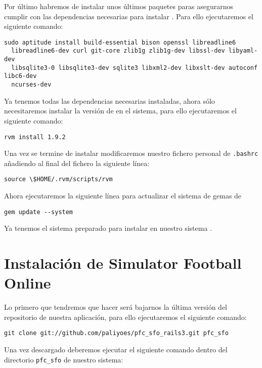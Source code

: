Por último habremos de instalar unos últimos paquetes paras asegurarnos cumplir
con las dependencias necesarias para instalar . Para ello
ejecutaremos el siguiente comando:

\begin{lstlisting}[style=consola]
  sudo aptitude install build-essential bison openssl libreadline6
  libreadline6-dev curl git-core zlib1g zlib1g-dev libssl-dev libyaml-dev
  libsqlite3-0 libsqlite3-dev sqlite3 libxml2-dev libxslt-dev autoconf libc6-dev
  ncurses-dev
\end{lstlisting}

Ya tenemos todas las dependencias necesarias instaladas, ahora sólo
necesitaremos instalar la versión de  en el sistema, para ello
ejecutaremos el siguiente comando:

\begin{lstlisting}[style=consola]
  rvm install 1.9.2
\end{lstlisting}

Una vez se termine de instalar modificaremos nuestro fichero personal de
\texttt{.bashrc} añadiendo al final del fichero la siguiente línea:

\begin{lstlisting}[style=consola]
  source \$HOME/.rvm/scripts/rvm
\end{lstlisting}

Ahora ejecutaremos la siguiente línea para actualizar el sistema de gemas de

\begin{lstlisting}[style=consola]
  gem update --system
\end{lstlisting}

Ya tenemos el sistema preparado para instalar en nuestro sistema
.

\section{Instalación de Simulator Football Online}

Lo primero que tendremos que hacer será bajarnos la última versión del
repositorio de nuestra aplicación, para ello ejecutaremos el siguiente comando:

\begin{lstlisting}[style=consola]
  git clone git://github.com/paliyoes/pfc_sfo_rails3.git pfc_sfo
\end{lstlisting}

Una vez descargado deberemos ejecutar el siguiente comando dentro del directorio
\texttt{pfc\_sfo} de nuestro sistema:

